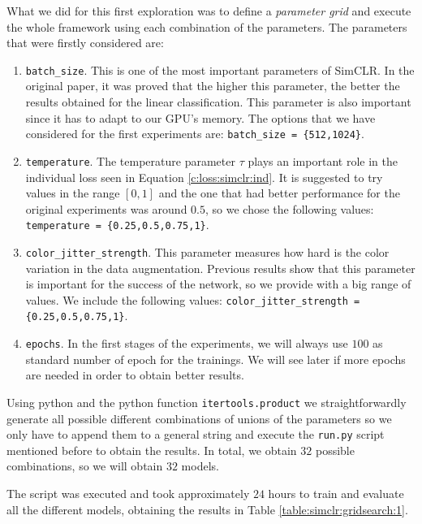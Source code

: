 What we did for this first exploration was to define a \emph{parameter grid} and execute the whole framework using each combination of the parameters. The parameters that were firstly considered are:
\begin{enumerate}
\item \lstinline{batch_size}. This is one of the most important parameters of SimCLR. In the original paper, it was proved that the higher this parameter, the better the results obtained for the linear classification. This parameter is also important since it has to adapt to our GPU's memory. The options that we have considered for the first experiments are: \lstinline|batch_size = {512,1024}|.

\item \lstinline{temperature}. The temperature parameter $\tau$ plays an important role in the individual loss seen in Equation \eqref{c:loss:simclr:ind}. It is suggested to try values in the range $[0,1]$ and the one that had better performance for the original experiments was around $0.5$, so we chose the following values: \lstinline|temperature = {0.25,0.5,0.75,1}|.

\item \lstinline{color_jitter_strength}. This parameter measures how hard is the color variation in the data augmentation. Previous results show that this parameter is important for the success of the network, so we provide with a big range of values. We include the following values: \lstinline|color_jitter_strength = {0.25,0.5,0.75,1}|.

\item \lstinline{epochs}. In the first stages of the experiments, we will always use $100$ as standard number of epoch for the trainings. We will see later if more epochs are needed in order to obtain better results.
\end{enumerate}

Using python and the python function \lstinline{itertools.product} we straightforwardly generate all possible different combinations of unions of the parameters so we only have to append them to a general string and execute the \lstinline{run.py} script mentioned before to obtain the results. In total, we obtain $32$ possible combinations, so we will obtain $32$ models. 

The script was executed and took approximately $24$ hours to train and evaluate all the different models, obtaining the results in Table \ref{table:simclr:gridsearch:1}.

